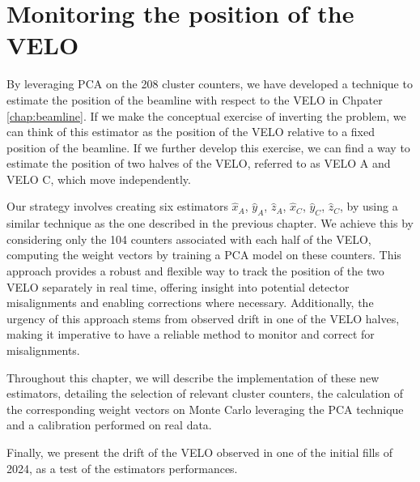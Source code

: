 \chapter{Monitoring the position of the VELO}
\label{chp:pos_VELO}

By leveraging PCA on the 208 cluster counters, we have developed a technique to estimate the position of the beamline with respect to the VELO in Chpater \ref{chap:beamline}. If we make the conceptual exercise of inverting the problem, we can think of this estimator as the position of the VELO relative to a fixed position of the beamline. If we further develop this exercise, we can find a way to estimate the position of two halves of the VELO, referred to as VELO A and VELO C, which move independently. 

Our strategy involves creating six estimators $\hat{x}_A$, $\hat{y}_A$, $\hat{z}_A$, $\hat{x}_C$, $\hat{y}_C$, $\hat{z}_C$, by using a similar technique as the one described in the previous chapter. We achieve this by considering only the 104 counters associated with each half of the VELO, computing the weight vectors by training a PCA model on these counters. This approach provides a robust and flexible way to track the position of the two VELO separately in real time, offering insight into potential detector misalignments and enabling corrections where necessary. Additionally, the urgency of this approach stems from observed drift in one of the VELO halves, making it imperative to have a reliable method to monitor and correct for misalignments.

Throughout this chapter, we will describe the implementation of these new estimators, detailing the selection of relevant cluster counters, the calculation of the corresponding weight vectors on Monte Carlo leveraging the PCA technique and a calibration performed on real data.

Finally, we present the drift of the VELO observed in one of the initial fills of 2024, as a test of the estimators performances.





